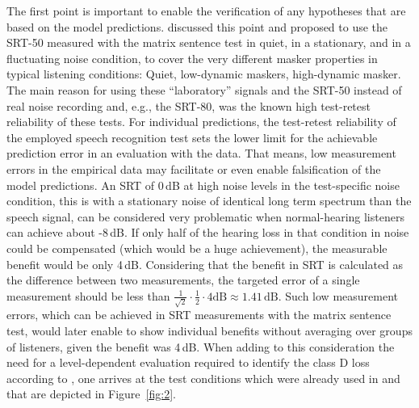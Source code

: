 \documentclass[10pt,a4paper,twocolumn]{article}
\begin{document}
The first point is important to enable the verification of any hypotheses that are based on the model predictions.
%
\cite{schaedler2020a} discussed this point and proposed to use the SRT-50 measured with the matrix sentence test in quiet, in a stationary, and in a fluctuating noise condition, to cover the very different masker properties in typical listening conditions: Quiet, low-dynamic maskers, high-dynamic masker.
%
The main reason for using these \enquote{laboratory} signals and the SRT-50 instead of real noise recording and, e.g., the SRT-80, was the known high test-retest reliability of these tests.
%
For individual predictions, the test-retest reliability of the employed speech recognition test sets the lower limit for the achievable prediction error in an evaluation with the data.
%
That means, low measurement errors in the empirical data may facilitate or even enable falsification of the model predictions.
%
An SRT of 0\,dB at high noise levels in the test-specific noise condition, this is with a stationary noise of identical long term spectrum than the speech signal, can be considered very problematic when normal-hearing listeners can achieve about -8\,dB.
%
If only half of the hearing loss in that condition in noise could be compensated (which would be a huge achievement), the measurable benefit would be only 4\,dB.
%
Considering that the benefit in SRT is calculated as the difference between two measurements, the targeted error of a single measurement should be less than $\frac{1}{\sqrt{2}} \cdot \frac{1}{2} \cdot 4\text{dB} \approx 1.41\,\text{dB}$.
%
Such low measurement errors, which can be achieved in SRT measurements with the matrix sentence test, would later enable to show individual benefits without averaging over groups of listeners, given the benefit was 4\,dB.
%
When adding to this consideration the need for a level-dependent evaluation required to identify the class D loss according to \cite{plomp1978}, one arrives at the test conditions which were already used in \cite{kollmeier2015} and that are depicted in Figure~\ref{fig:2}.
\end{document}
